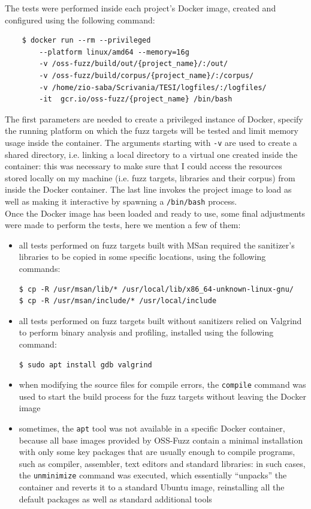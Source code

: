\newpage
The tests were performed inside each project's Docker image, created and configured using the following command:
\begin{verbatim}
    $ docker run --rm --privileged 
        --platform linux/amd64 --memory=16g 
        -v /oss-fuzz/build/out/{project_name}/:/out/
        -v /oss-fuzz/build/corpus/{project_name}/:/corpus/    
        -v /home/zio-saba/Scrivania/TESI/logfiles/:/logfiles/ 
        -it  gcr.io/oss-fuzz/{project_name} /bin/bash
\end{verbatim}
The first parameters are needed to create a privileged instance of Docker, specify the running platform on which the fuzz targets will be tested and limit memory usage inside the container. The arguments starting with \verb|-v| are used to create a shared directory, i.e. linking a local directory to a virtual one created inside the container: this was necessary to make sure that I could access the resources stored locally on my machine (i.e. fuzz targets, libraries and their corpus) from inside the Docker container. The last line invokes the project image to load as well as making it interactive by spawning a \verb|/bin/bash| process.
\ \\

Once the Docker image has been loaded and ready to use, some final adjustments were made to perform the tests, here we mention a few of them:
\begin{itemize}
    \item all tests performed on fuzz targets built with MSan required the sanitizer's libraries to be copied in some specific locations, using the following commands:
\begin{verbatim}
$ cp -R /usr/msan/lib/* /usr/local/lib/x86_64-unknown-linux-gnu/
$ cp -R /usr/msan/include/* /usr/local/include
\end{verbatim}
    \item all tests performed on fuzz targets built without sanitizers relied on Valgrind to perform binary analysis and profiling, installed using the following command:
\begin{verbatim}
$ sudo apt install gdb valgrind
\end{verbatim} 
    \item when modifying the source files for compile errors, the \verb|compile| command was used to start the build process for the fuzz targets without leaving the Docker image
    \item sometimes, the \verb|apt| tool was not available in a specific Docker container, because all base images provided by OSS-Fuzz contain a minimal installation with only some key packages that are usually enough to compile programs, such as compiler, assembler, text editors and standard libraries: in such cases, the \verb|unminimize| command was executed, which essentially ``unpacks'' the container and reverts it to a standard Ubuntu image, reinstalling all the default packages as well as standard additional tools
\end{itemize}



